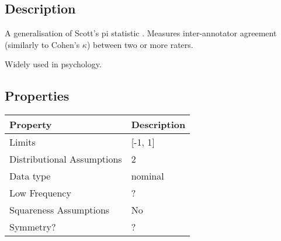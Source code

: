 \documentclass[11pt]{article}
\begin{document}
\subsection{Description}
A generalisation of Scott's pi statistic %
.  Measures inter-annotator agreement (similarly to Cohen's $\kappa$) between two or more raters.

Widely used in psychology.

\cite{fleiss1971measuring}



\subsection{Properties}
\begin{tabular}{| l || l |}
    \hline
    {\bf Property} & {\bf Description} \\
    \hline
    Limits & [-1, 1] \\ \hline

    Distributional Assumptions& 2 \\ \hline

    Data type & nominal \\ \hline

    Low Frequency & ? \\ \hline

    Squareness Assumptions & No \\ \hline
    
    Symmetry? & ? \\ \hline

\end{tabular}
\end{document}
